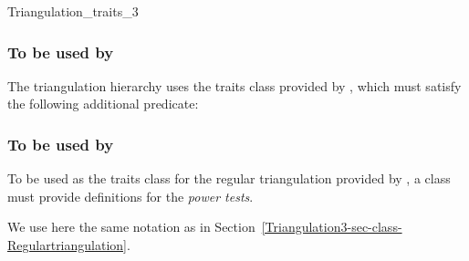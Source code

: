 \begin{ccRefConcept}{Triangulation_traits_3}
\subsubsection{To be used by \protect {}}

\ccDefinition

The triangulation hierarchy uses the traits class provided by
, which must satisfy the following additional predicate:



\subsubsection{To be used by \protect 
{}}

\ccDefinition

To be used as the traits class for the regular triangulation provided
by \cgal, a class must provide definitions for the \textit{power tests}.

We use here the same notation as in
Section~\ref{Triangulation3-sec-class-Regulartriangulation}. 


\end{ccRefConcept}
